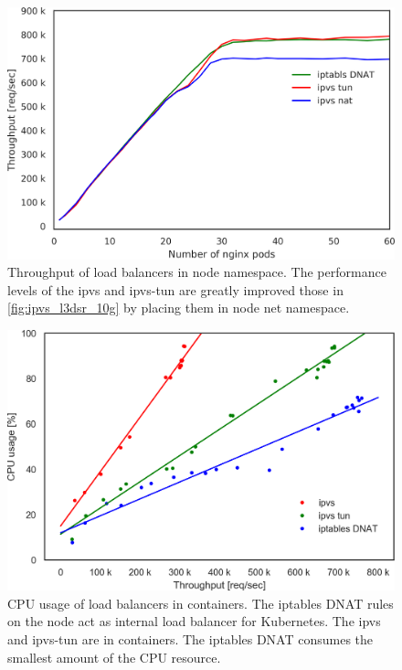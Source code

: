 \begin{figure}[h]
  \centering
  \includegraphics[width=0.8\columnwidth]{Figs/ipvs_node_l3dsr_10g}
  \par\bigskip
  \centering
  \begin{minipage}{0.9\columnwidth}
    \caption[Throughput of load balancers in node namespace]{
      Throughput of load balancers in node namespace.
      The performance levels of the ipvs and ipvs-tun are greatly improved those in \ref{fig:ipvs_l3dsr_10g} by placing them in node net namespace.
    }
    \label{fig:ipvs_node_l3dsr_10g}
  \end{minipage}
\end{figure}

\begin{figure}[h]
  \centering
  \includegraphics[width=0.8\columnwidth]{Figs/cpu_usage_10g}
  \par\bigskip
  \centering
  \begin{minipage}{0.9\columnwidth}
    \caption[CPU usage of load balancers in containers]{
      CPU usage of load balancers in containers.
      The iptables DNAT rules on the node act as internal load balancer for Kubernetes.
      The ipvs and ipvs-tun are in containers.
      The iptables DNAT consumes the smallest amount of the CPU resource.
    }
    \label{fig:cpu_usage_10g}
  \end{minipage}
\end{figure}

